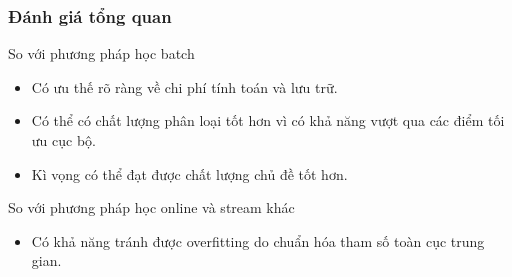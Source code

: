 \documentclass{beamer}
\begin{document}


\begin{frame}[shrink=25]
\frametitle{Đánh giá tổng quan}
\begin{block}{So với phương pháp học batch}
\begin{itemize}
\item Có ưu thế rõ ràng về chi phí tính toán và lưu trữ.
\item Có thể có chất lượng phân loại tốt hơn vì có khả năng vượt qua các điểm tối ưu cục bộ.
\item Kì vọng có thể đạt được chất lượng chủ đề tốt hơn.
\end{itemize}
\end{block}
\begin{block}{So với phương pháp học online và stream khác}
\begin{itemize}
\item Có khả năng tránh được overfitting do chuẩn hóa tham số toàn cục trung gian.
\end{itemize}
\end{block}
\end{frame}
\end{document}
